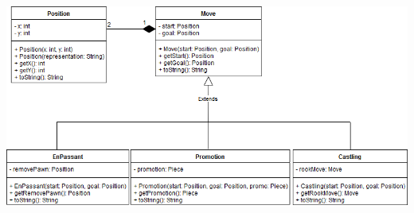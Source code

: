 \documentclass[parskip=full]{scrartcl}
\begin{document}
		\begin{minipage}{\linewidth}
			\centering
			\includegraphics[width=1\linewidth]{Diagramme/Move}
			\label{fig:move}
		\end{minipage}
\end{document}
